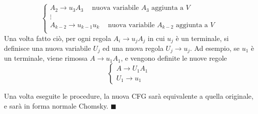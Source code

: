 \documentclass[10pt, letterpaper]{report}
\begin{document}
\begin{itemize}
$$\begin{cases}
        A_2\longrightarrow u_3A_3 \ \ \ \ \text{ nuova variabile $A_3$ aggiunta a $V$}\\ 
        \vdots \\ 
        A_{k-2}\longrightarrow u_{k-1}u_k \ \ \ \ \text{ nuova variabile $A_{k-2}$ aggiunta a $V$}\\ 
    \end{cases} $$
    Una volta fatto ciò, per ogni regola $A_i\longrightarrow u_jA_j$ in cui $u_j$ è un 
    terminale, si definisce una nuova variabile $U_j$ ed una 
    nuova regola $U_j\longrightarrow u_j$. Ad esempio, se $u_1$ è un terminale, viene rimossa $A\longrightarrow u_1A_1$, 
    e vengono definite le nuove regole $$\begin{cases}
        A\longrightarrow U_1A_1\\ 
        U_1\longrightarrow u_1
    \end{cases}$$ 
\end{itemize}
Una volta eseguite le procedure, la nuova CFG sarà equivalente a quella originale, e sarà in forma normale Chomsky. $\blacksquare$ 
\end{document}
